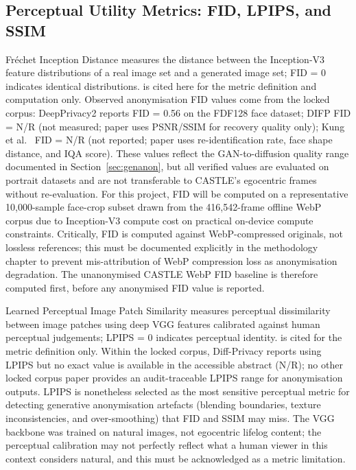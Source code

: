 \documentclass[12pt, onecolumn]{IEEEtran}
\begin{document}
\subsection{Perceptual Utility Metrics: FID, LPIPS, and SSIM}

Fr\'{e}chet Inception Distance \cite{heusel2017fid} measures the distance
between the Inception-V3 feature distributions of a real image set and a
generated image set; FID = 0 indicates identical distributions.
\cite{heusel2017fid} is cited here for the metric definition and
computation only. Observed anonymisation FID values come from the locked
corpus: DeepPrivacy2 \cite{hukkelas2023deepprivacy2} reports FID = 0.56
on the FDF128 face dataset; DIFP \cite{you2024difp} FID = N/R (not measured; paper uses PSNR/SSIM for recovery quality only); Kung et al.\ \cite{kung2025face} FID = N/R (not reported; paper uses re-identification rate, face shape distance, and IQA score).
These values reflect the GAN-to-diffusion quality range
documented in Section~\ref{sec:genanon}, but all verified values are
evaluated on portrait datasets and are not transferable to CASTLE's
egocentric frames without re-evaluation. For this project, FID will be
computed on a representative 10,000-sample face-crop subset drawn from
the 416,542-frame offline WebP corpus due to Inception-V3 compute cost on
practical on-device compute constraints. Critically, FID is computed against WebP-compressed originals, not lossless references; this must be
documented explicitly in the methodology chapter to prevent
mis-attribution of WebP compression loss as anonymisation degradation.
The unanonymised CASTLE WebP FID baseline is therefore computed first,
before any anonymised FID value is reported.

Learned Perceptual Image Patch Similarity \cite{zhang2018lpips} measures
perceptual dissimilarity between image patches using deep VGG features
calibrated against human perceptual judgements; LPIPS = 0 indicates
perceptual identity. \cite{zhang2018lpips} is cited for the metric
definition only. Within the locked corpus, Diff-Privacy
\cite{he2024diffprivacy} reports using LPIPS but no exact value is
available in the accessible abstract (N/R); no other locked corpus paper
provides an audit-traceable LPIPS range for anonymisation outputs. LPIPS
is nonetheless selected as the most sensitive perceptual metric for
detecting generative anonymisation artefacts (blending boundaries,
texture inconsistencies, and over-smoothing) that FID and SSIM may miss.
The VGG backbone was trained on natural images, not egocentric lifelog
content; the perceptual calibration may not perfectly reflect what a
human viewer in this context considers natural, and this must be
acknowledged as a metric limitation.
\end{document}

